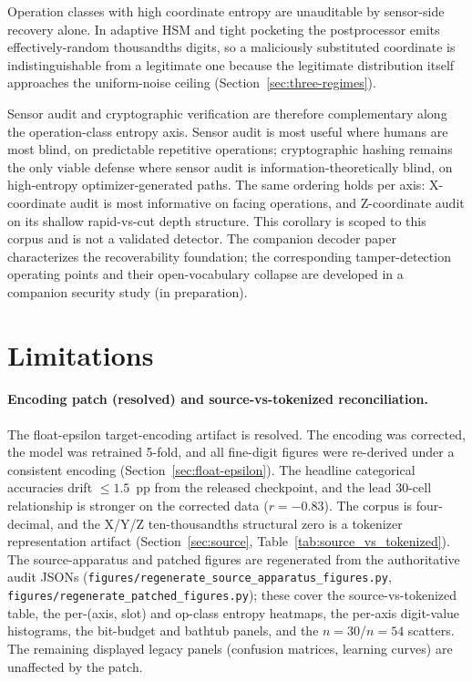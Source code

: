 \documentclass[entropy,article,submit,moreauthors,pdftex]{Definitions/mdpi}
\begin{document}
Operation classes with high coordinate entropy are unauditable by sensor-side recovery alone. In adaptive HSM and tight pocketing the postprocessor emits effectively-random thousandths digits, so a maliciously substituted coordinate is indistinguishable from a legitimate one because the legitimate distribution itself approaches the uniform-noise ceiling (Section~\ref{sec:three-regimes}).

Sensor audit and cryptographic verification are therefore complementary along the operation-class entropy axis. Sensor audit is most useful where humans are most blind, on predictable repetitive operations; cryptographic hashing remains the only viable defense where sensor audit is information-theoretically blind, on high-entropy optimizer-generated paths. The same ordering holds per axis: X-coordinate audit is most informative on facing operations, and Z-coordinate audit on its shallow rapid-vs-cut depth structure. This corollary is scoped to this corpus and is not a validated detector. The companion decoder paper~\cite{paperA_decoder} characterizes the recoverability foundation; the corresponding tamper-detection operating points and their open-vocabulary collapse are developed in a companion security study (in preparation).

\section{Limitations}
\label{sec:limitations}

\paragraph{Encoding patch (resolved) and source-vs-tokenized reconciliation.} The float-epsilon target-encoding artifact is resolved. The encoding was corrected, the model was retrained 5-fold, and all fine-digit figures were re-derived under a consistent encoding (Section~\ref{sec:float-epsilon}). The headline categorical accuracies drift $\le\!1.5$~pp from the released checkpoint, and the lead $30$-cell relationship is stronger on the corrected data ($r=-0.83$). The corpus is four-decimal, and the X/Y/Z ten-thousandths structural zero is a tokenizer representation artifact (Section~\ref{sec:source}, Table~\ref{tab:source_vs_tokenized}). The source-apparatus and patched figures are regenerated from the authoritative audit JSONs (\texttt{figures/regenerate\_source\_apparatus\_figures.py}, \texttt{figures/regenerate\_patched\_figures.py}); these cover the source-vs-tokenized table, the per-(axis, slot) and op-class entropy heatmaps, the per-axis digit-value histograms, the bit-budget and bathtub panels, and the $n=30$/$n=54$ scatters. The remaining displayed legacy panels (confusion matrices, learning curves) are unaffected by the patch.
\end{document}
